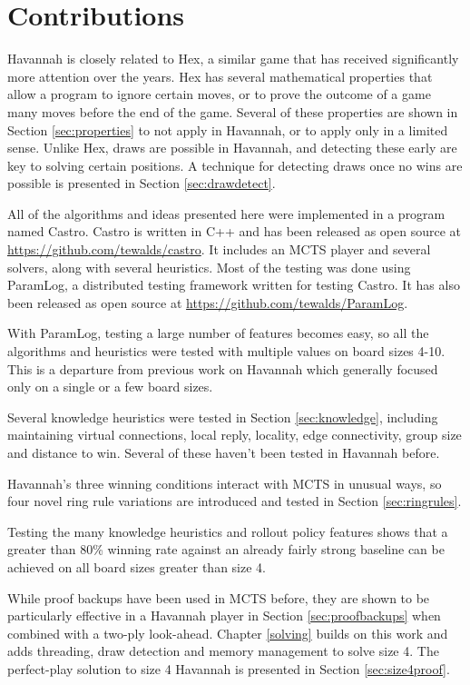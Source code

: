 \section{Contributions}

Havannah is closely related to Hex, a similar game that has received significantly more attention over the years. Hex has several mathematical properties that allow a program to ignore certain moves, or to prove the outcome of a game many moves before the end of the game. Several of these properties are shown in Section \ref{sec:properties} to not apply in Havannah, or to apply only in a limited sense. Unlike Hex, draws are possible in Havannah, and detecting these early are key to solving certain positions. A technique for detecting draws once no wins are possible is presented in Section \ref{sec:drawdetect}.

All of the algorithms and ideas presented here were implemented in a program named Castro. Castro is written in C++ and has been released as open source at \url{https://github.com/tewalds/castro}. It includes an MCTS player and several solvers, along with several heuristics. Most of the testing was done using ParamLog, a distributed testing framework written for testing Castro. It has also been released as open source at \url{https://github.com/tewalds/ParamLog}.

With ParamLog, testing a large number of features becomes easy, so all the algorithms and heuristics were tested with multiple values on board sizes 4-10. This is a departure from previous work on Havannah which generally focused only on a single or a few board sizes.

Several knowledge heuristics were tested in Section \ref{sec:knowledge}, including maintaining virtual connections, local reply, locality, edge connectivity, group size and distance to win. Several of these haven't been tested in Havannah before.

Havannah's three winning conditions interact with MCTS in unusual ways, so four novel ring rule variations are introduced and tested in Section \ref{sec:ringrules}.

Testing the many knowledge heuristics and rollout policy features shows that a greater than 80\% winning rate against an already fairly strong baseline can be achieved on all board sizes greater than size 4.

While proof backups have been used in MCTS before, they are shown to be particularly effective in a Havannah player in Section \ref{sec:proofbackups} when combined with a two-ply look-ahead. Chapter \ref{solving} builds on this work and adds threading, draw detection and memory management to solve size 4. The perfect-play solution to size 4 Havannah is presented in Section \ref{sec:size4proof}.


